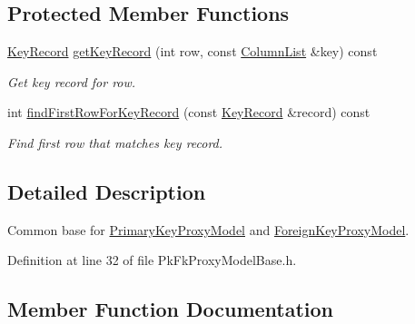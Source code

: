 \subsection*{Protected Member Functions}
\begin{DoxyCompactItemize}
\item 
\hyperlink{class_mdt_1_1_item_model_1_1_key_record}{Key\+Record} \hyperlink{class_mdt_1_1_item_model_1_1_pk_fk_proxy_model_base_abd0ab0772251670482fd935f6e3c72a7}{get\+Key\+Record} (int row, const \hyperlink{class_mdt_1_1_item_model_1_1_column_list}{Column\+List} \&key) const 
\begin{DoxyCompactList}\small\item\em Get key record for row. \end{DoxyCompactList}\item 
int \hyperlink{class_mdt_1_1_item_model_1_1_pk_fk_proxy_model_base_a4351563a94c85b165670a72e87f54bcf}{find\+First\+Row\+For\+Key\+Record} (const \hyperlink{class_mdt_1_1_item_model_1_1_key_record}{Key\+Record} \&record) const 
\begin{DoxyCompactList}\small\item\em Find first row that matches key record. \end{DoxyCompactList}\end{DoxyCompactItemize}


\subsection{Detailed Description}
Common base for \hyperlink{class_mdt_1_1_item_model_1_1_primary_key_proxy_model}{Primary\+Key\+Proxy\+Model} and \hyperlink{class_mdt_1_1_item_model_1_1_foreign_key_proxy_model}{Foreign\+Key\+Proxy\+Model}. 

Definition at line 32 of file Pk\+Fk\+Proxy\+Model\+Base.\+h.



\subsection{Member Function Documentation}
